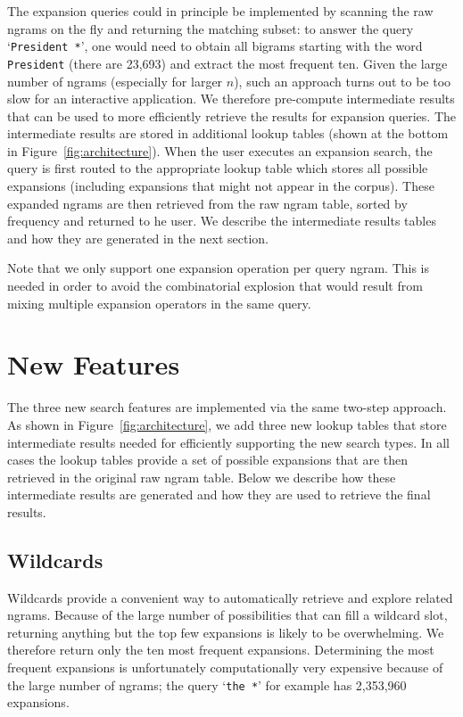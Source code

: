 \documentclass[11pt,a4paper]{article}
\newcommand{\query}[1]{\texttt{#1}}
\begin{document}
The expansion queries could in principle be implemented by scanning the raw ngrams on the fly and returning the matching subset: to answer the query `\query{President *}', one would need to obtain all bigrams starting with the word \query{President} (there are 23,693) and extract the most frequent ten. Given the large number of ngrams (especially for larger $n$), such an approach turns out to be too slow for an interactive application. We therefore pre-compute intermediate results that can be used to more efficiently retrieve the results for expansion queries. The intermediate results are stored in additional lookup tables (shown at the bottom in Figure~\ref{fig:architecture}). When the user executes an expansion search, the query is first routed to the appropriate lookup table which stores all possible expansions (including expansions that might not appear in the corpus).  These expanded ngrams are then retrieved from the raw ngram table, sorted by frequency and returned to he user.
We describe the intermediate results tables and how they are generated in the next section.

Note that we only support one expansion operation per query ngram. This is needed in order to avoid the combinatorial explosion that would result from mixing multiple expansion operators in the same query.


\section{New Features}
\label{sec:features}
The three new search features are implemented via the same two-step approach. As shown in Figure~\ref{fig:architecture}, we add three new lookup tables that store intermediate results needed for efficiently supporting the new search types. In all cases the lookup tables provide a set of possible expansions that are then retrieved in the original raw ngram table. Below we describe how these intermediate results are generated and how they are used to retrieve the final results.

\subsection{Wildcards}
\label{sec:wildcards}
	Wildcards provide a convenient way to automatically retrieve and explore related ngrams. Because of the large number of possibilities that can fill a wildcard slot, returning anything but the top few expansions is likely to be overwhelming. We therefore return only the ten most frequent expansions. Determining the most frequent expansions is unfortunately computationally very expensive because of the large number of ngrams; the query `\query{the *}' for example has 2,353,960 expansions.
\end{document}
